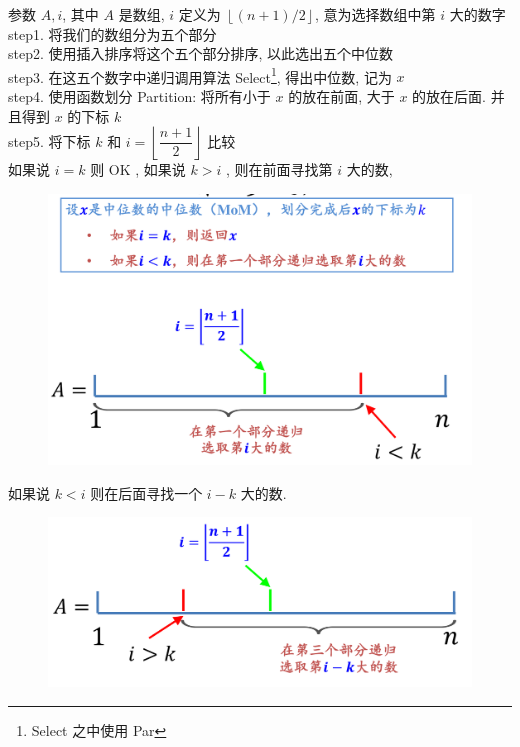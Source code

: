 \documentclass[a4paper, 10pt]{ctexart} %
\begin{document}
参数 $A , i$, 其中 $A$ 是数组, $i$ 
定义为 $\left\lfloor \left(n +1\right) / 2 \right\rfloor$, 意为选择数组中第 $i$ 大的数字
\\
\noindent step1. 将我们的数组分为五个部分
\\step2. 使用插入排序将这个五个部分排序, 以此选出五个中位数
\\step3. 在这五个数字中递归调用算法 {\sffamily Select}\footnote{Select 之中使用 Par}, 得出中位数, 记为 $x$ 
\\step4. 使用函数划分 {\sffamily Partition}: 将所有小于 $x$ 的放在前面, 
大于 $x$ 的放在后面. 并且得到 $x$ 的下标 $k$
\\step5. 将下标 $k$ 和 $i =  \left\lfloor \dfrac{n+1}{2} \right\rfloor$ 比较
\\如果说 $i = k$ 则 OK , 如果说 $k > i$ , 则在前面寻找第 $i$ 大的数, \\
\begin{figure}[H]
    \centering
    \includegraphics[scale = 0.3]{4.png}\caption{}
\end{figure}
如果说 $k < i$ 则在后面寻找一个 $i - k$ 大的数.\\
\begin{figure}[H]
    \centering
    \includegraphics[scale = 0.3]{5.png}\caption{}
\end{figure}
\end{document}
